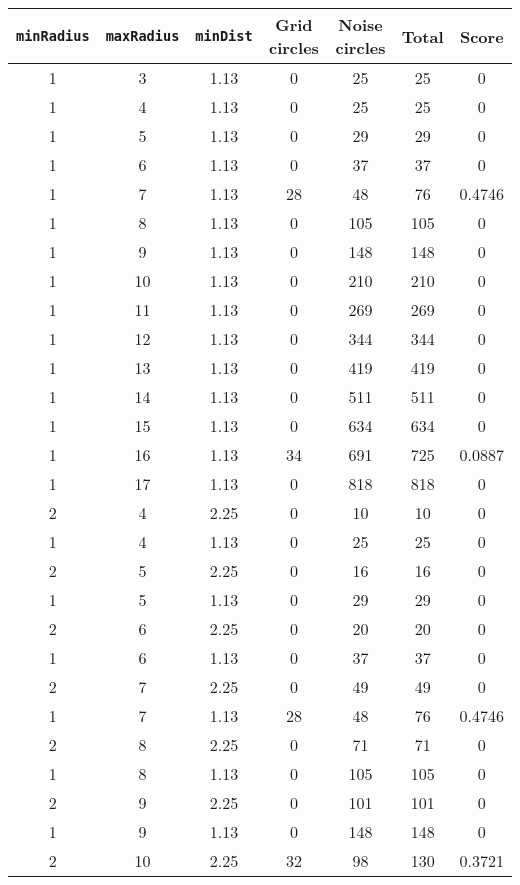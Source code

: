 \documentclass[letterpaper, 12pt]{article}
\begin{document}
\begin{longtable}{|c|c|c|c|c|c|c|}
\hline
\textbf{\texttt{minRadius}} & \textbf{\texttt{maxRadius}} & \textbf{\texttt{minDist}} & \textbf{Grid circles} & \textbf{Noise circles} & \textbf{Total} & \textbf{Score} \\
\hline
1 & 3 & 1.13 & 0 & 25 & 25 & 0 \\
\hline
1 & 4 & 1.13 & 0 & 25 & 25 & 0 \\
\hline
1 & 5 & 1.13 & 0 & 29 & 29 & 0 \\
\hline
1 & 6 & 1.13 & 0 & 37 & 37 & 0 \\
\hline
1 & 7 & 1.13 & 28 & 48 & 76 & 0.4746 \\
\hline
1 & 8 & 1.13 & 0 & 105 & 105 & 0 \\
\hline
1 & 9 & 1.13 & 0 & 148 & 148 & 0 \\
\hline
1 & 10 & 1.13 & 0 & 210 & 210 & 0 \\
\hline
1 & 11 & 1.13 & 0 & 269 & 269 & 0 \\
\hline
1 & 12 & 1.13 & 0 & 344 & 344 & 0 \\
\hline
1 & 13 & 1.13 & 0 & 419 & 419 & 0 \\
\hline
1 & 14 & 1.13 & 0 & 511 & 511 & 0 \\
\hline
1 & 15 & 1.13 & 0 & 634 & 634 & 0 \\
\hline
1 & 16 & 1.13 & 34 & 691 & 725 & 0.0887 \\
\hline
1 & 17 & 1.13 & 0 & 818 & 818 & 0 \\
\hline
2 & 4 & 2.25 & 0 & 10 & 10 & 0 \\
\hline
1 & 4 & 1.13 & 0 & 25 & 25 & 0 \\
\hline
2 & 5 & 2.25 & 0 & 16 & 16 & 0 \\
\hline
1 & 5 & 1.13 & 0 & 29 & 29 & 0 \\
\hline
2 & 6 & 2.25 & 0 & 20 & 20 & 0 \\
\hline
1 & 6 & 1.13 & 0 & 37 & 37 & 0 \\
\hline
2 & 7 & 2.25 & 0 & 49 & 49 & 0 \\
\hline
1 & 7 & 1.13 & 28 & 48 & 76 & 0.4746 \\
\hline
2 & 8 & 2.25 & 0 & 71 & 71 & 0 \\
\hline
1 & 8 & 1.13 & 0 & 105 & 105 & 0 \\
\hline
2 & 9 & 2.25 & 0 & 101 & 101 & 0 \\
\hline
1 & 9 & 1.13 & 0 & 148 & 148 & 0 \\
\hline
2 & 10 & 2.25 & 32 & 98 & 130 & 0.3721 \\

\end{longtable}
\end{document}
